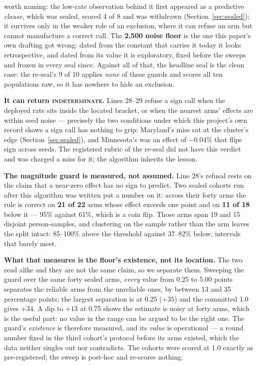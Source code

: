 \documentclass[conference]{IEEEtran}
\begin{document}
worth naming: the low-rate observation behind it first appeared as a predictive
\emph{clause}, which was sealed, scored 4 of 8 and was withdrawn
(Section~\ref{sec:sealed}); it survives only in the weaker role of an exclusion, where it
can refuse an arm but cannot manufacture a correct call. The \textbf{2{,}500 noise floor} is
the one this paper's own drafting got wrong: dated from the constant that carries it today
it looks retrospective, and dated from its value it is exploratory, fixed before the
sweeps and frozen in every seal since. Against all of that, the headline
seal is the clean case: the re-seal's 9 of 10 applies \emph{none} of these guards and scores
all ten populations raw, so it has nowhere to hide an exclusion.

\textbf{It can return \textsc{indeterminate}.} Lines 28--29 refuse a sign call when the
deployed rate sits inside the located bracket, or when the nearest arms' effects are
within seed noise --- precisely the two conditions under which this project's own record
shows a sign call has nothing to grip: Maryland's miss sat at the cluster's edge
(Section~\ref{sec:sealed}), and Minnesota's was an effect of $-0.04\%$ that flips sign
across seeds. The registered
rubric of the re-seal did not have this verdict and was charged a miss for it; the
algorithm inherits the lesson.

\textbf{The magnitude guard is measured, not assumed.} Line 28's refusal rests on the
claim that a near-zero effect has no sign to predict. Two sealed cohorts run after this
algorithm was written put a number on it: across their forty arms the rule is correct on
\textbf{21 of 22} arms whose effect exceeds one point and on \textbf{11 of 18} below it ---
95\% against 61\%, which is a coin flip. Those arms span 19 and 15 disjoint person-samples,
and clustering on the sample rather than the arm leaves the split intact: 85--100\% above
the threshold against 37--82\% below, intervals that barely meet.

\textbf{What that measures is the floor's existence, not its location.} The two read alike
and they are not the same claim, so we separate them. Sweeping the guard over the same forty
sealed arms, \emph{every} value from 0.25 to 5.00 points separates the reliable arms from the
unreliable ones, by between 13 and 35 percentage points; the largest separation is at 0.25
($+35$) and the committed 1.0 gives $+34$. A dip to $+13$ at 0.75 shows the estimate is noisy
at forty arms, which is the useful part: no value in the range can be argued to be the right
one. The guard's \emph{existence} is therefore measured, and its \emph{value} is
operational --- a round number fixed in the third cohort's protocol before its arms existed,
which the data neither singles out nor contradicts. The cohorts were scored at 1.0 exactly as
pre-registered; the sweep is post-hoc and re-scores nothing.
\end{document}
